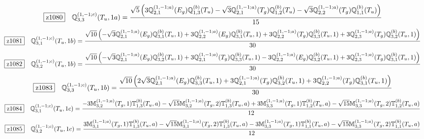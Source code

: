 \documentclass[fleqn,10pt,landscape]{jsarticle}
\begin{document}
\begin{dmath*}
\hspace*{3mm}\fbox{z1080}\quad \mathbb{Q}_{3,3}^{(1,-1;c)}(T_{u},1a)=\frac{\sqrt{5} \left(3 \mathbb{Q}_{2,1}^{(1,-1;a)}(E_{g}) \mathbb{Q}_{1,3}^{(b)}(T_{u}) - \sqrt{3} \mathbb{Q}_{2,1}^{(1,-1;a)}(T_{g}) \mathbb{Q}_{1,2}^{(b)}(T_{u}) - \sqrt{3} \mathbb{Q}_{2,2}^{(1,-1;a)}(T_{g}) \mathbb{Q}_{1,1}^{(b)}(T_{u})\right)}{15}
\end{dmath*}
\begin{dmath*}
\hspace*{3mm}\fbox{z1081}\quad \mathbb{Q}_{3,1}^{(1,-1;c)}(T_{u},1b)=\frac{\sqrt{10} \left(- \sqrt{3} \mathbb{Q}_{2,1}^{(1,-1;a)}(E_{g}) \mathbb{Q}_{3,1}^{(b)}(T_{u},1) + 3 \mathbb{Q}_{2,2}^{(1,-1;a)}(E_{g}) \mathbb{Q}_{3,1}^{(b)}(T_{u},1) + 3 \mathbb{Q}_{2,2}^{(1,-1;a)}(T_{g}) \mathbb{Q}_{3,3}^{(b)}(T_{u},1) + 3 \mathbb{Q}_{2,3}^{(1,-1;a)}(T_{g}) \mathbb{Q}_{3,2}^{(b)}(T_{u},1)\right)}{30}
\end{dmath*}
\begin{dmath*}
\hspace*{3mm}\fbox{z1082}\quad \mathbb{Q}_{3,2}^{(1,-1;c)}(T_{u},1b)=\frac{\sqrt{10} \left(- \sqrt{3} \mathbb{Q}_{2,1}^{(1,-1;a)}(E_{g}) \mathbb{Q}_{3,2}^{(b)}(T_{u},1) + 3 \mathbb{Q}_{2,1}^{(1,-1;a)}(T_{g}) \mathbb{Q}_{3,3}^{(b)}(T_{u},1) - 3 \mathbb{Q}_{2,2}^{(1,-1;a)}(E_{g}) \mathbb{Q}_{3,2}^{(b)}(T_{u},1) + 3 \mathbb{Q}_{2,3}^{(1,-1;a)}(T_{g}) \mathbb{Q}_{3,1}^{(b)}(T_{u},1)\right)}{30}
\end{dmath*}
\begin{dmath*}
\hspace*{3mm}\fbox{z1083}\quad \mathbb{Q}_{3,3}^{(1,-1;c)}(T_{u},1b)=\frac{\sqrt{10} \left(2 \sqrt{3} \mathbb{Q}_{2,1}^{(1,-1;a)}(E_{g}) \mathbb{Q}_{3,3}^{(b)}(T_{u},1) + 3 \mathbb{Q}_{2,1}^{(1,-1;a)}(T_{g}) \mathbb{Q}_{3,2}^{(b)}(T_{u},1) + 3 \mathbb{Q}_{2,2}^{(1,-1;a)}(T_{g}) \mathbb{Q}_{3,1}^{(b)}(T_{u},1)\right)}{30}
\end{dmath*}
\begin{dmath*}
\hspace*{3mm}\fbox{z1084}\quad \mathbb{Q}_{3,1}^{(1,-1;c)}(T_{u},1c)=\frac{- 3 \mathbb{M}_{3,2}^{(1,-1;a)}(T_{g},1) \mathbb{T}_{1,3}^{(b)}(T_{u},a) - \sqrt{15} \mathbb{M}_{3,2}^{(1,-1;a)}(T_{g},2) \mathbb{T}_{1,3}^{(b)}(T_{u},a) + 3 \mathbb{M}_{3,3}^{(1,-1;a)}(T_{g},1) \mathbb{T}_{1,2}^{(b)}(T_{u},a) - \sqrt{15} \mathbb{M}_{3,3}^{(1,-1;a)}(T_{g},2) \mathbb{T}_{1,2}^{(b)}(T_{u},a)}{12}
\end{dmath*}
\begin{dmath*}
\hspace*{3mm}\fbox{z1085}\quad \mathbb{Q}_{3,2}^{(1,-1;c)}(T_{u},1c)=\frac{3 \mathbb{M}_{3,1}^{(1,-1;a)}(T_{g},1) \mathbb{T}_{1,3}^{(b)}(T_{u},a) - \sqrt{15} \mathbb{M}_{3,1}^{(1,-1;a)}(T_{g},2) \mathbb{T}_{1,3}^{(b)}(T_{u},a) - 3 \mathbb{M}_{3,3}^{(1,-1;a)}(T_{g},1) \mathbb{T}_{1,1}^{(b)}(T_{u},a) - \sqrt{15} \mathbb{M}_{3,3}^{(1,-1;a)}(T_{g},2) \mathbb{T}_{1,1}^{(b)}(T_{u},a)}{12}
\end{dmath*}
\end{document}

